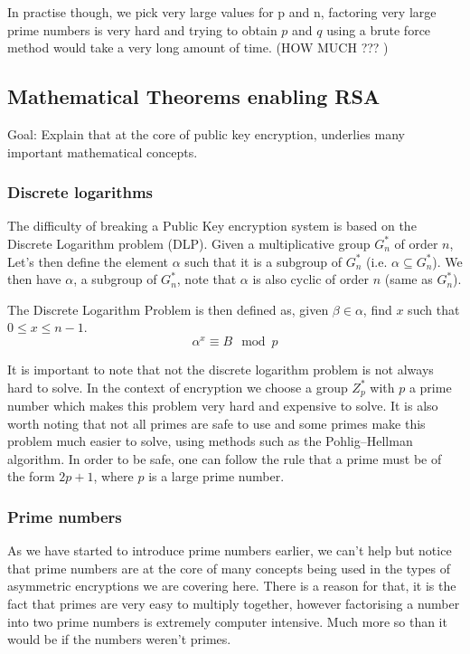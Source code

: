 \documentclass[conference]{IEEEtran}
\begin{document}
In practise though, we pick very large values for p and n, factoring very large prime
numbers is very hard and trying to obtain $p$ and $q$ using a brute force method
would take a very long amount of time.
(HOW MUCH ??? )


\subsection{Mathematical Theorems enabling RSA}
Goal: Explain that at the core of public key encryption, underlies
many important mathematical concepts.


\subsubsection{Discrete logarithms}
The difficulty of breaking a Public Key encryption system is based on the 
Discrete Logarithm problem (DLP). 
Given a multiplicative group $G_{n}^{*}$ of order $n$,
Let's then define the element $\alpha$ such that it is a subgroup of $G_{n}^{*}$ 
(i.e. $\alpha \subseteq G_{n}^{*}$). We then have $\alpha$, a subgroup of $G_{n}^{*}$,
note that $\alpha$ is also cyclic of order $n$ (same as $G_{n}^{*}$).


The Discrete Logarithm Problem is then defined as, given $\beta \in \alpha$,
find $x$ such that $0 \leq x \leq n - 1$.
\begin{equation}
    \alpha^{x} \equiv B\mod p
\end{equation}

It is important to note that not the discrete logarithm problem
is not always hard to solve. In the context of encryption we choose a group
$Z_{p}^*$ with $p$ a prime number which makes this problem very hard and 
expensive to solve.
It is also worth noting that not all primes are safe to use and some primes
make this problem much easier to solve, using methods such as the 
Pohlig–Hellman algorithm. In order to be safe, one can follow the rule
that a prime must be of the form $2p + 1$, where $p$ is a large prime number. 

\subsubsection{Prime numbers}
As we have started to introduce prime numbers earlier, we can't help 
but notice that prime numbers are at the core of many concepts being
used in the types of  asymmetric encryptions we are covering here. 
There is a reason for that, it is the fact that primes are very easy to 
multiply together, however factorising a number into two prime numbers is 
extremely computer intensive. Much more so than it would be if the numbers 
weren't primes. 
\end{document}
